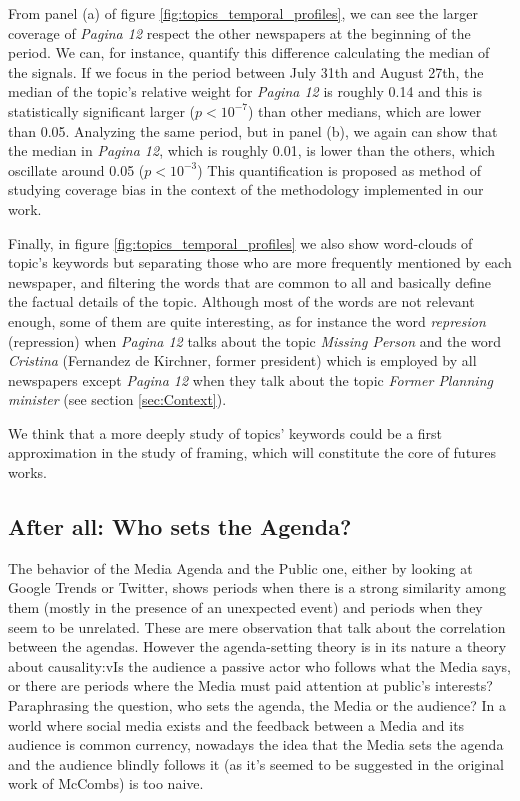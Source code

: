 \documentclass[a4paper, 12pt]{article}
\begin{document}
\par From panel (a) of figure \ref{fig:topics_temporal_profiles}, we can see the larger coverage of \emph{Pagina 12} respect the other newspapers at the beginning of the period. We can, for instance, quantify this difference calculating  the median of the signals. If we focus in the period between July 31th and August 27th, the median of the topic's relative weight for \emph{Pagina 12} is roughly 0.14 and this is statistically significant larger ($p < 10^{-7}$) than other medians, which are lower than 0.05.
Analyzing the same period, but in panel (b), we again can show that the median in \emph{Pagina 12}, which is roughly 0.01, is lower than the others, which oscillate around 0.05 ($p<10^{-3}$)
This quantification is proposed as method of studying coverage bias in the context of the methodology implemented in our work. 

\par Finally, in figure \ref{fig:topics_temporal_profiles} we also show word-clouds of topic's keywords but separating those who are more frequently mentioned by each newspaper, and filtering the words that are common to all and basically define the factual details of the topic.
Although most of the words are not relevant enough, some of them are quite interesting, as for instance the word \emph{represion} (repression) when \emph{Pagina 12} talks about the topic \emph{Missing Person} and the word \emph{Cristina} (Fernandez de Kirchner, former president) which is employed by all newspapers except \emph{Pagina 12} when they  talk about the topic \emph{Former Planning minister} (see section \ref{sec:Context}).

We think that a more deeply study of topics' keywords could be a first approximation in the study of framing, which will constitute the core of futures works.

\subsection{After all: Who sets the Agenda?}
\label{sec:who_sets}

\par The behavior of the Media Agenda and the Public one, either by looking at Google Trends or Twitter, shows periods when there is a strong similarity among them (mostly in the presence of an unexpected event) and periods when they seem to be unrelated. These are mere observation that talk about the correlation between the agendas.
However the agenda-setting theory is in its nature a theory about causality:vIs the audience a passive actor who follows what the Media says, or there are periods where the Media must paid attention at public's interests?
Paraphrasing the question, who sets the agenda, the Media or the audience?
In a world where social media exists and the feedback between a Media and its audience is common currency, nowadays the idea that the Media sets the agenda and the audience blindly follows it (as it's seemed to be suggested in the original work of McCombs) is too naive.
 
\end{document}
